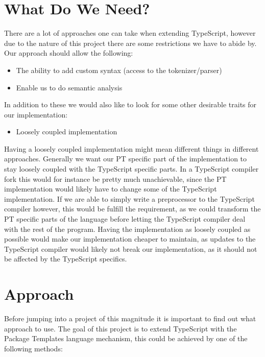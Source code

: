\section{What Do We Need?}\label{sec:what-do-we-need}

There are a lot of approaches one can take when extending TypeScript, however due to the nature of this project there are some restrictions we have to abide by.
Our approach should allow the following:

\begin{itemize}
    \item The ability to add custom syntax (access to the tokenizer/parser)
    \item Enable us to do semantic analysis
\end{itemize}

In addition to these we would also like to look for some other desirable traits for our implementation:

\begin{itemize}
    \item Loosely coupled implementation
\end{itemize}

Having a loosely coupled implementation might mean different things in different approaches.
Generally we want our PT specific part of the implementation to stay loosely coupled with the TypeScript specific parts.
In a TypeScript compiler fork this would for instance be pretty much unachievable, since the PT implementation would likely have to change some of the TypeScript implementation.
If we are able to simply write a preprocessor to the TypeScript compiler however, this would be fulfill the requirement, as we could transform the PT specific parts of the language before letting the TypeScript compiler deal with the rest of the program.
Having the implementation as loosely coupled as possible would make our implementation cheaper to maintain, as updates to the TypeScript compiler would likely not break our implementation, as it should not be affected by the TypeScript specifics.

\section{Approach}\label{sec:choosing-the-right-approach}

Before jumping into a project of this magnitude it is important to find out what approach to use. 
The goal of this project is to extend TypeScript with the Package Templates language mechanism, this could be achieved by one of the following methods:

